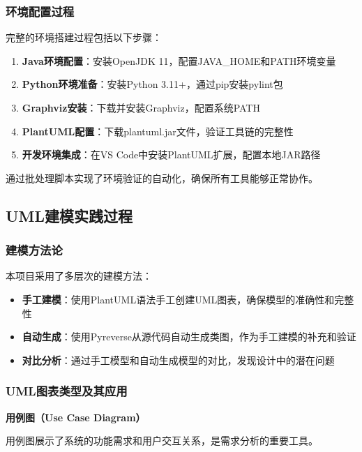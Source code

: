 \documentclass[a4paper]{article}
\begin{document}
\subsubsection{环境配置过程}

完整的环境搭建过程包括以下步骤：

\begin{enumerate}
    \item \textbf{Java环境配置}：安装OpenJDK 11，配置JAVA\_HOME和PATH环境变量
    \item \textbf{Python环境准备}：安装Python 3.11+，通过pip安装pylint包
    \item \textbf{Graphviz安装}：下载并安装Graphviz，配置系统PATH
    \item \textbf{PlantUML配置}：下载plantuml.jar文件，验证工具链的完整性
    \item \textbf{开发环境集成}：在VS Code中安装PlantUML扩展，配置本地JAR路径
\end{enumerate}

通过批处理脚本实现了环境验证的自动化，确保所有工具能够正常协作。

\subsection{UML建模实践过程}

\subsubsection{建模方法论}

本项目采用了多层次的建模方法：

\begin{itemize}
    \item \textbf{手工建模}：使用PlantUML语法手工创建UML图表，确保模型的准确性和完整性
    \item \textbf{自动生成}：使用Pyreverse从源代码自动生成类图，作为手工建模的补充和验证
    \item \textbf{对比分析}：通过手工模型和自动生成模型的对比，发现设计中的潜在问题
\end{itemize}

\subsubsection{UML图表类型及其应用}

\textbf{用例图（Use Case Diagram）}

用例图展示了系统的功能需求和用户交互关系，是需求分析的重要工具。
\end{document}

